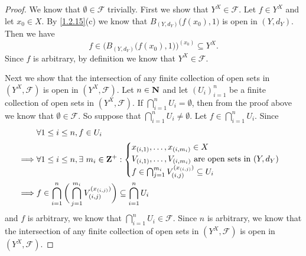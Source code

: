 \begin{proof}
  We know that \(\emptyset \in \mathcal{F}\) trivially.
  First we show that \(Y^X \in \mathcal{F}\).
  Let \(f \in Y^X\) and let \(x_0 \in X\).
  By \cref{1.2.15}(c) we know that \(B_{(Y, d_Y)}\big(f(x_0), 1\big)\) is open in \((Y, d_Y)\).
  Then we have
  \[
    f \in \Big(B_{(Y, d_Y)}\big(f(x_0), 1\big)\Big)^{(x_0)} \subseteq Y^X.
  \]
  Since \(f\) is arbitrary, by definition we know that \(Y^X \in \mathcal{F}\).

  Next we show that the intersection of any finite collection of open sets in \((Y^X, \mathcal{F})\) is open in \((Y^X, \mathcal{F})\).
  Let \(n \in \mathbf{N}\) and let \((U_i)_{i = 1}^n\) be a finite collection of open sets in \((Y^X, \mathcal{F})\).
  If \(\bigcap_{i = 1}^n U_i = \emptyset\), then from the proof above we know that \(\emptyset \in \mathcal{F}\).
  So suppose that \(\bigcap_{i = 1}^n U_i \neq \emptyset\).
  Let \(f \in \bigcap_{i = 1}^n U_i\).
  Since
  \begin{align*}
             & \forall 1 \leq i \leq n, f \in U_i                                                                                  \\
    \implies & \forall 1 \leq i \leq n, \exists\ m_i \in \mathbf{Z}^+ : \begin{cases}
                                                                  x_{(i, 1)}, \dots, x_{(i, m_i)} \in X                              \\
                                                                  V_{(i, 1)}, \dots, V_{(i, m_i)} \text{ are open sets in } (Y, d_Y) \\
                                                                  f \in \bigcap_{j = 1}^{m_i} V_{(i, j)}^{(x_{(i, j)})} \subseteq U_i
                                                                \end{cases} \\
    \implies & f \in \bigcap_{i = 1}^n \bigg(\bigcap_{j = 1}^{m_i} V_{(i, j)}^{(x_{(i, j)})}\bigg) \subseteq \bigcap_{i = 1}^n U_i
  \end{align*}
  and \(f\) is arbitrary, we know that \(\bigcap_{i = 1}^n U_i \in \mathcal{F}\).
  Since \(n\) is arbitrary, we know that the intersection of any finite collection of open sets in \((Y^X, \mathcal{F})\) is open in \((Y^X, \mathcal{F})\).


\end{proof}
